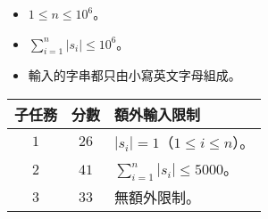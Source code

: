 \begin{itemize}
  \item $1 \le n \le 10^6$。
  \item $\sum_{i=1}^n |s_i| \le 10^6$。
  \item 輸入的字串都只由小寫英文字母組成。
\end{itemize}

\begin{center}
\begin{tabular}{ccl} \hline
  \bf{子任務} & \bf{分數} & \bf{額外輸入限制} \\ \hline
  $1$ & $26$ & $|s_i| = 1$（$1 \le i \le n$）。 \\
  $2$ & $41$ & $\sum_{i=1}^n |s_i| \le 5000$。 \\
  $3$ & $33$ & 無額外限制。 \\
\hline \end{tabular}
\end{center}
